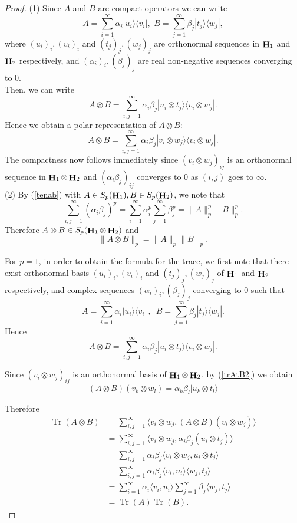 \documentclass[10pt,a4paper]{amsart}
\DeclareMathOperator{\Hi}{{\bf H}}
\DeclareMathOperator{\Tr}{Tr}
\newcommand{\beq}{\begin{equation}}
\newcommand{\eq}{\end{equation}}
\renewcommand\eqref[1]{(\ref{#1})} %
\begin{document}
\begin{proof} (1) Since $A$ and $B$ are compact operators we can write
\[A=\sum\limits_{i=1}^{\infty}\alpha_i|u_i\rangle\langle v_i|,\,\, B=\sum\limits_{j=1}^{\infty}\beta_j|t_j\rangle\langle w_j|, \]
where $(u_i)_i, (v_i)_i $ and $(t_j)_j, (w_j)_j $ are orthonormal sequences in $ \Hi_1$ and  $ \Hi_2$ respectively, and $(\alpha_i)_i, (\beta_j)_j$ are real non-negative sequences converging to $0$.\\

Then, we can write 
\beq A\otimes B=\sum\limits_{i,j=1}^{\infty}\alpha_i\beta_j|u_i\otimes t_j\rangle\langle v_i\otimes w_j|.\label{trAtB}\eq
Hence we obtain a polar representation of $A\otimes B$:
\beq A\otimes B=\sum\limits_{i,j=1}^{\infty}\alpha_i\beta_j|v_i\otimes w_j\rangle\langle v_i\otimes w_j|.\label{tenab}\eq
The compactness now follows immediately since $ (v_i\otimes w_j)_{ij}$ is an orthonormal sequence in $ \Hi_1\otimes \Hi_2$ and $(\alpha_i\beta_j)_{ij}$ converges to $0$ as $(i,j)$ goes to $\infty$.\\

(2) By \eqref{tenab} with  $A\in S_p(\Hi_1), B\in S_p(\Hi_2)$, we note that
\[\sum\limits_{i,j=1}^{\infty}(\alpha_i\beta_j)^p=\sum\limits_{i=1}^{\infty}\alpha_i^p\sum\limits_{j=1}^{\infty}\beta_j^p=\|A\|_p^p\|B\|_p^p .\]
Therefore  $A\otimes B\in S_p( \Hi_1\otimes \Hi_2)$ and 
\[\|A\otimes B\|_p=\|A\|_p\|B\|_p.\]

For $p=1$, in order to obtain the formula for the trace, we first note that there exist orthonormal basis  $(u_i)_i, (v_i)_i $ and $(t_j)_j, (w_j)_j $ of $ \Hi_1$ and  $ \Hi_2$ respectively, and complex sequences $(\alpha_i)_i, (\beta_j)_j$ converging to $0$ such that
\[A=\sum\limits_{i=1}^{\infty}\alpha_i|u_i\rangle\langle v_i|\,,\,\,\, B=\sum\limits_{j=1}^{\infty}\beta_j|t_j\rangle\langle w_j|. \]
Hence
\beq A\otimes B=\sum\limits_{i,j=1}^{\infty}\alpha_i\beta_j|u_i\otimes t_j\rangle\langle v_i\otimes w_j|.\label{trAtB2}\eq

  
Since  $ (v_i\otimes w_j)_{ij}$ is an orthonormal basis of $ \Hi_1\otimes \Hi_2$,  by \eqref{trAtB2} we obtain
 \[ (A\otimes B)(v_k\otimes w_l)=\alpha_k\beta_l|u_k\otimes t_l\rangle\]
 
Therefore
 \begin{align*}
 \Tr(A\otimes B)&=\sum\limits_{i,j=1}^{\infty}\langle v_i\otimes w_j, (A\otimes B)(v_i\otimes w_j)\rangle\\ 
 &=\sum\limits_{i,j=1}^{\infty}\langle v_i\otimes w_j, \alpha_i\beta_j(u_i\otimes t_j)\rangle\\
 &=\sum\limits_{i,j=1}^{\infty}\alpha_i\beta_j\langle v_i\otimes w_j, u_i\otimes t_j\rangle\\
  &=\sum\limits_{i,j=1}^{\infty}\alpha_i\beta_j\langle v_i, u_i\rangle\langle w_j,  t_j\rangle\\
  &=\sum\limits_{i=1}^{\infty}\alpha_i\langle v_i, u_i\rangle
  \sum\limits_{j=1}^{\infty}\beta_j\langle w_j,  t_j\rangle\\
 &=\Tr(A)\Tr(B).
\end{align*} 
\end{proof}
\end{document}

